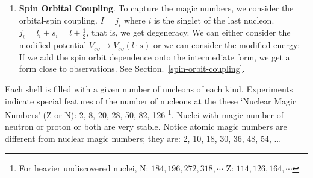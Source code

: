\documentclass{school-22.101-notes}
\begin{document}
\begin{enumerate}
\item \textbf{Spin Orbital Coupling}. To capture the magic numbers, we consider the orbital-spin coupling. $I = j_i$ where $i$ is the singlet of the last nucleon. $j_i = l_i + s_i = l\pm \frac{1}{2}$, that is, we get degeneracy.  We can either consider the modified potential $V_{so} \to V_{so} (l \cdot s)$  or we can consider the modified energy: 
If we add the spin orbit dependence onto the intermediate form, we get a form close to observations. See Section.~\ref{spin-orbit-coupling}. 
\end{enumerate}




 \label{magic-number}
Each shell is filled with a given number of nucleons of each kind. Experiments indicate special features of the number of nucleons at the these `Nuclear Magic Numbers' (Z or N): 2, 8, 20, 28, 50, 82, 126 \footnote{For heavier undiscovered nuclei, N: $184, 196, 272, 318, \cdots$ Z: $114, 126, 164, \cdots$}. Nuclei with magic number of neutron or proton or both are very stable. Notice atomic magic numbers are different from nuclear magic numbers; they are: 2, 10, 18, 30, 36, 48, 54, ...
\end{document}
